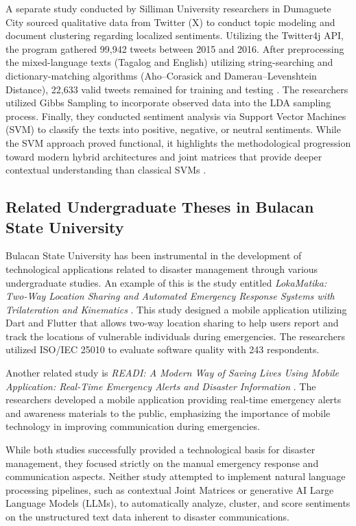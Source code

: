 A separate study conducted by Silliman University researchers in Dumaguete City
sourced qualitative data from Twitter (X) to conduct topic modeling and
document clustering regarding localized sentiments. Utilizing the Twitter4j
API, the program gathered 99,942 tweets between 2015 and 2016. After
preprocessing the mixed-language texts (Tagalog and English) utilizing
string-searching and dictionary-matching algorithms (Aho--Corasick and
Damerau--Levenshtein Distance), 22,633 valid tweets remained for training and
testing \parencite{montenegro2018}. The researchers utilized Gibbs Sampling to
incorporate observed data into the LDA sampling process. Finally, they
conducted sentiment analysis via Support Vector Machines (SVM) to classify the
texts into positive, negative, or neutral sentiments. While the SVM approach
proved functional, it highlights the methodological progression toward modern
hybrid architectures and joint matrices that provide deeper contextual
understanding than classical SVMs \parencite{montenegro2018}.

\subsection*{Related Undergraduate Theses in Bulacan State University}

Bulacan State University has been instrumental in the development of
technological applications related to disaster management through various
undergraduate studies. An example of this is the study entitled
\emph{LokaMatika: Two-Way Location Sharing and Automated Emergency Response
	Systems with Trilateration and Kinematics} \parencite{manalo2024}. This study
designed a mobile application utilizing Dart and Flutter that allows two-way
location sharing to help users report and track the locations of vulnerable
individuals during emergencies. The researchers utilized ISO/IEC 25010 to
evaluate software quality with 243 respondents.

Another related study is \emph{READI: A Modern Way of Saving Lives Using
	Mobile Application: Real-Time Emergency Alerts and Disaster Information}
\parencite{deguzman2019}. The researchers developed a mobile application providing
real-time emergency alerts and awareness materials to the public, emphasizing
the importance of mobile technology in improving communication during
emergencies.

While both studies successfully provided a technological basis for disaster
management, they focused strictly on the manual emergency response and
communication aspects. Neither study attempted to implement natural language
processing pipelines, such as contextual Joint Matrices or generative AI Large
Language Models (LLMs), to automatically analyze, cluster, and score sentiments
on the unstructured text data inherent to disaster communications.

